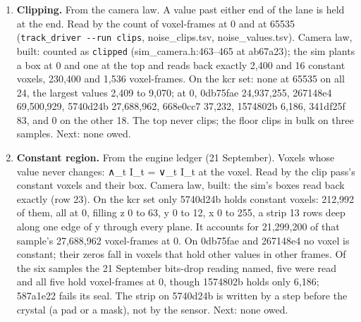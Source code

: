 \begin{enumerate}
\item \textbf{Clipping.} From the camera law. A value past either end of the lane is held at the end. Read by the count of voxel-frames at 0 and at 65535 (\texttt{track\_\allowbreak{}driver -\allowbreak{}-\allowbreak{}run clips}, noise\_\allowbreak{}clips.tsv, noise\_\allowbreak{}values.tsv). Camera law, built: counted as \texttt{clipped} (sim\_\allowbreak{}camera.h:463–465 at ab67a23); the sim plants a box at 0 and one at the top and reads back exactly 2,400 and 16 constant voxels, 230,400 and 1,536 voxel-frames. On the kcr set: none at 65535 on all 24, the largest values 2,409 to 9,070; at 0, 0db75fae 24,937,255, 267148e4 69,500,929, 5740d24b 27,688,962, 668e0cc7 37,232, 1574802b 6,186, 341df25f 83, and 0 on the other 18. The top never clips; the floor clips in bulk on three samples. Next: none owed.
\item \textbf{Constant region.} From the engine ledger (21 September). Voxels whose value never changes: ∧\_\allowbreak{}t I\_\allowbreak{}t = ∨\_\allowbreak{}t I\_\allowbreak{}t at the voxel. Read by the clip pass's constant voxels and their box. Camera law, built: the sim's boxes read back exactly (row 23). On the kcr set only 5740d24b holds constant voxels: 212,992 of them, all at 0, filling z 0 to 63, y 0 to 12, x 0 to 255, a strip 13 rows deep along one edge of y through every plane. It accounts for 21,299,200 of that sample's 27,688,962 voxel-frames at 0. On 0db75fae and 267148e4 no voxel is constant; their zeros fall in voxels that hold other values in other frames. Of the six samples the 21 September bits-drop reading named, five were read and all five hold voxel-frames at 0, though 1574802b holds only 6,186; 587a1e22 fails its seal. The strip on 5740d24b is written by a step before the crystal (a pad or a mask), not by the sensor. Next: none owed.

\end{enumerate}
